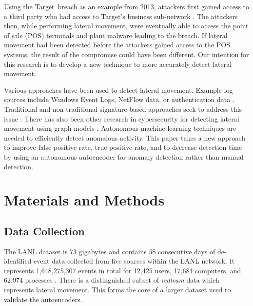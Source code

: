 \documentclass[sigconf]{acmart}
\begin{document}

Using the Target\texttrademark\ breach as an example from 2013, attackers first gained access to a third party who had access to Target's business sub-network \cite{SHU}. The attackers then,
while performing lateral movement, were eventually able to access the point of sale (POS) terminals and plant malware leading to the breach. If lateral movement had been detected before the attackers
gained access to the POS systems, the result of the compromise could have been different. Our intention for this research is to develop a new technique to more accurately detect lateral movement.

Various approaches have been used to detect lateral movement. Example log sources include Windows Event Logs, NetFlow data, or authentication data \cite{ABE}.
Traditional and non-traditional signature-based approaches seek to address this issue \cite{CYRUS}.  There has also been other research in cybersecurity for detecting lateral movement using graph models \cite{FAWAZ}.  Autonomous machine learning techniques are needed to efficiently detect anomalous activity.  This paper takes a new approach to improve false positive rate, true positive rate, and to decrease detection time by using an autonomous autoencoder for anomaly detection rather than manual detection.

\section{Materials and Methods}
 
\subsection{Data Collection}

The LANL dataset is 73 gigabytes and contains 58 consecutive days of de-identified event data collected from five sources within the LANL network. It represents 1,648,275,307 events in total
for 12,425 users, 17,684 computers, and 62,974 processes \cite{KENT}. There is a distinguished subset of \textit{redteam} data which represents lateral movement. This forms the core of a larger dataset used to validate the autoencoders.
\end{document}
